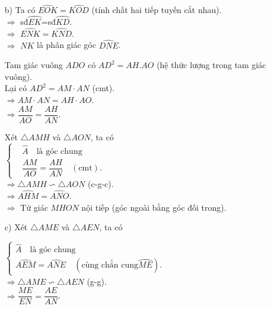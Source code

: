 \begin{ex}
{{}
}
	\begin{enumerate}
		\item[b)] Ta có $\widehat{EOK}=\widehat{KOD}$ (tính chất hai tiếp tuyến cắt nhau).\\
		$\Rightarrow$ sđ$\wideparen{EK}$=sđ$\wideparen{KD}$.\\
		$\Rightarrow$ $\widehat{ENK}=\widehat{KND}$.\\
		$\Rightarrow$ $NK$ là phân giác góc $\widehat{DNE}$.
		
		Tam giác vuông $ADO$ có $AD^2=AH.AO$ (hệ thức lượng trong tam giác vuông).\\
		Lại có $AD^2=AM \cdot AN$ (cmt).\\
		$\Rightarrow AM \cdot AN=AH \cdot AO$.\\
		$\Rightarrow \dfrac{AM}{AO}=\dfrac{AH}{AN}$.
		
		Xét $\triangle AMH$ và $\triangle AON$, ta có\\
		$\begin{cases}
		&\widehat{A}  \quad \text{là góc chung}\\
		&\dfrac{AM}{AO}=\dfrac{AH}{AN} \quad (\text{cmt}).
		\end{cases}$\\
		$\Rightarrow \triangle AMH \backsim \triangle AON$ (c-g-c).\\
		$\Rightarrow \widehat{AHM}=\widehat{ANO}$.\\
		$\Rightarrow$ Tứ giác $MHON$ nội tiếp (góc ngoài bằng góc đối trong).
		
		\item[c)] Xét $\triangle AME$ và $\triangle AEN$, ta có
		
		$\begin{cases}
		\widehat{A} \quad \text{là góc chung}\\
		\widehat{AEM}=\widehat{ANE} \quad (\text{cùng chắn cung} \wideparen{ME}).
		\end{cases}$\\
		$\Rightarrow \triangle AME \backsim \triangle AEN$ (g-g).\\
		$\Rightarrow \dfrac{ME}{EN}=\dfrac{AE}{AN}$.
		

\end{enumerate}
\end{ex}
